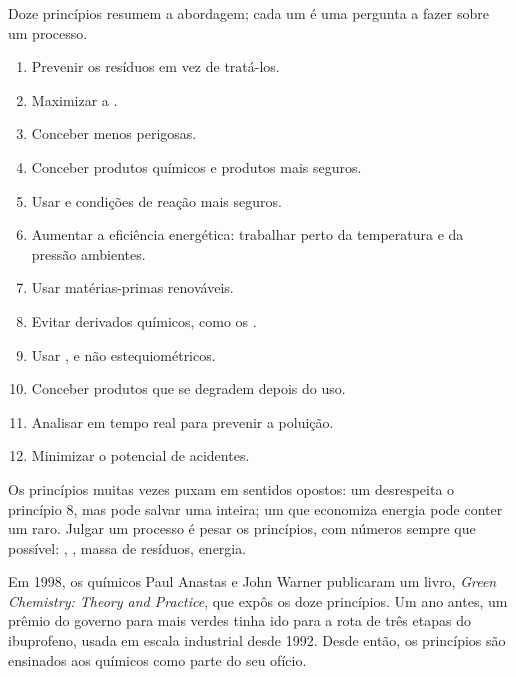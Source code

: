 Doze princípios resumem a abordagem; cada um é uma pergunta a fazer
sobre um processo.
\begin{enumerate}
  \item Prevenir os resíduos em vez de tratá-los.
  \item Maximizar a .
  \item Conceber  menos perigosas.
  \item Conceber produtos químicos e produtos mais seguros.
  \item Usar  e condições de reação mais seguros.
  \item Aumentar a eficiência energética: trabalhar perto da temperatura
        e da pressão ambientes.
  \item Usar matérias-primas renováveis.
  \item Evitar derivados químicos, como os .
  \item Usar , e não  estequiométricos.
  \item Conceber produtos que se degradem depois do uso.
  \item Analisar em tempo real para prevenir a poluição.
  \item Minimizar o potencial de acidentes.
\end{enumerate}

\begin{remark}\label{rem:g12:synthesis-strategy:principles}
Os princípios muitas vezes puxam em sentidos opostos: um 
desrespeita o princípio 8, mas pode salvar uma  inteira; um
 que economiza energia pode conter um  raro. Julgar um
processo é pesar os princípios, com números sempre que possível:
, , massa de resíduos, energia.
\end{remark}

\begin{history}
Em 1998, os químicos Paul Anastas e John Warner publicaram um livro,
\emph{Green Chemistry: Theory and Practice}, que expôs os doze
princípios. Um ano antes, um prêmio do governo para  mais
verdes tinha ido para a rota de três etapas do ibuprofeno, usada em
escala industrial desde 1992. Desde então, os princípios são ensinados
aos químicos como parte do seu ofício.
\end{history}

